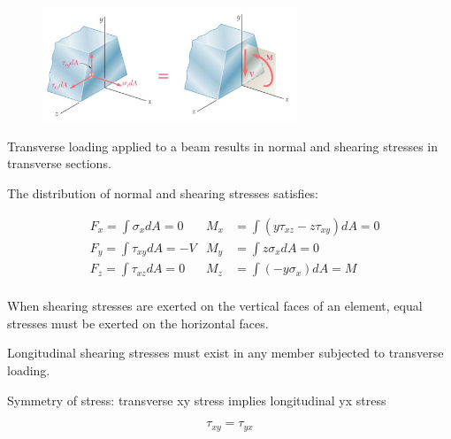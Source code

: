 \vspace{5pt}

\noindent \textbf{} 

\begin{figure}[!h]
\centering
\includegraphics[angle=0, width=3in]{TransverseShear-Figures/EquilibriumEqtn.png}
\vspace{-2mm}
\caption{\small {}}
\vspace{-3mm}
\label{Fig:EquilEqtn}
\end{figure}

\noindent Transverse loading applied to a beam results in normal and shearing stresses in transverse sections.

\vspace{5pt}

\noindent The distribution of normal and shearing stresses satisfies:

\[
\begin{align*}
&F_x = \int\sigma_x dA = 0 		 &M_x &= \int(y\tau_{xz} - z\tau_{xy})dA=0 \\
&F_y = \int\tau_{xy} dA = -V 	 &M_y &= \int z\sigma_{x} dA = 0 \\
&F_z = \int\tau_{xz} dA = 0 	 &M_z &= \int(-y\sigma_{x})dA = M \\
\end{align*}
\]

\noindent When shearing stresses are exerted on the vertical faces of an element, equal stresses must be exerted on the horizontal faces.

\vspace{5pt}

\noindent Longitudinal shearing stresses must exist in any member subjected to transverse loading.

\vspace{5pt}

\noindent Symmetry of stress: transverse xy stress implies longitudinal yx stress

\[\tau_{xy} = \tau_{yx}\]

\vspace{5pt}

